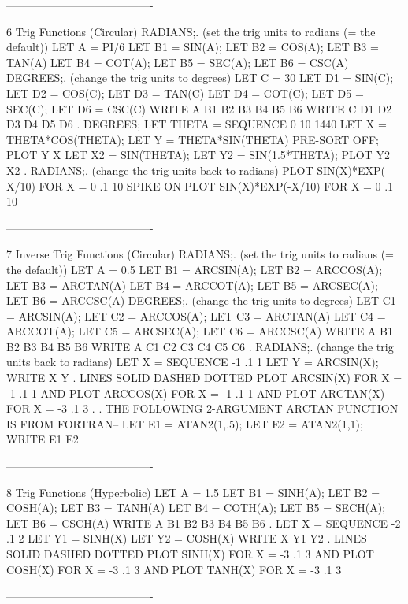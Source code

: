 ----------------------------------------
 
6
Trig Functions (Circular)
      RADIANS;. (set the trig units to radians (= the default))
      LET A = PI/6
      LET B1 = SIN(A); LET B2 = COS(A); LET B3 = TAN(A)
      LET B4 = COT(A); LET B5 = SEC(A); LET B6 = CSC(A)
      DEGREES;. (change the trig units to degrees)
      LET C = 30
      LET D1 = SIN(C); LET D2 = COS(C); LET D3 = TAN(C)
      LET D4 = COT(C); LET D5 = SEC(C); LET D6 = CSC(C)
      WRITE A B1 B2 B3 B4 B5 B6
      WRITE C D1 D2 D3 D4 D5 D6
      .
      DEGREES; LET THETA = SEQUENCE 0 10 1440
      LET X = THETA*COS(THETA); LET Y = THETA*SIN(THETA)
      PRE-SORT OFF; PLOT Y X
      LET X2 = SIN(THETA); LET Y2 = SIN(1.5*THETA); PLOT Y2 X2
      .
      RADIANS;. (change the trig units back to radians)
      PLOT SIN(X)*EXP(-X/10) FOR X = 0 .1 10
      SPIKE ON
      PLOT SIN(X)*EXP(-X/10) FOR X = 0 .1 10
 
----------------------------------------
 
7
Inverse Trig Functions (Circular)
      RADIANS;. (set the trig units to radians (= the default))
      LET A = 0.5
      LET B1 = ARCSIN(A); LET B2 = ARCCOS(A); LET B3 = ARCTAN(A)
      LET B4 = ARCCOT(A); LET B5 = ARCSEC(A); LET B6 = ARCCSC(A)
      DEGREES;. (change the trig units to degrees)
      LET C1 = ARCSIN(A); LET C2 = ARCCOS(A); LET C3 = ARCTAN(A)
      LET C4 = ARCCOT(A); LET C5 = ARCSEC(A); LET C6 = ARCCSC(A)
      WRITE A B1 B2 B3 B4 B5 B6
      WRITE A C1 C2 C3 C4 C5 C6
      .
      RADIANS;. (change the trig units back to radians)
      LET X = SEQUENCE -1 .1 1
      LET Y = ARCSIN(X); WRITE X Y
      .
      LINES SOLID DASHED DOTTED
      PLOT ARCSIN(X) FOR X = -1 .1 1 AND
      PLOT ARCCOS(X) FOR X = -1 .1 1 AND
      PLOT ARCTAN(X) FOR X = -3 .1 3
      .
     . THE FOLLOWING 2-ARGUMENT ARCTAN FUNCTION IS FROM FORTRAN--
      LET E1 = ATAN2(1,.5); LET E2 = ATAN2(1,1); WRITE E1 E2
 
----------------------------------------
 
8
Trig Functions (Hyperbolic)
      LET A = 1.5
      LET B1 = SINH(A); LET B2 = COSH(A); LET B3 = TANH(A)
      LET B4 = COTH(A); LET B5 = SECH(A); LET B6 = CSCH(A)
      WRITE A B1 B2 B3 B4 B5 B6
      .
      LET X = SEQUENCE -2 .1 2
      LET Y1 = SINH(X)
      LET Y2 = COSH(X)
      WRITE X Y1 Y2
      .
      LINES SOLID DASHED DOTTED
      PLOT SINH(X) FOR X = -3 .1 3 AND
      PLOT COSH(X) FOR X = -3 .1 3 AND
      PLOT TANH(X) FOR X = -3 .1 3
 
----------------------------------------
 
